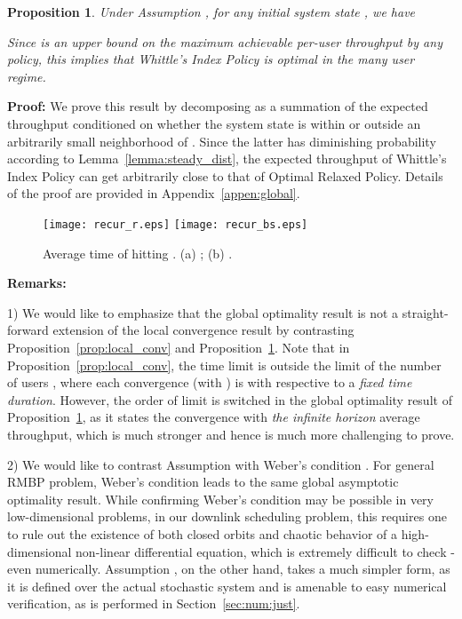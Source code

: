\documentclass[11pt,twocolumn]{IEEEtran}
\newtheorem{proposition}{Proposition}
\begin{document}
\begin{proposition}
\label{prop:asymp} Under Assumption , for any initial
system state , we have

\vspace{-12pt}
Since  is an upper bound on the maximum
achievable per-user throughput by any policy, this implies that
Whittle's Index Policy is optimal in the many user regime.
\end{proposition}

\noindent \textbf{Proof:} We prove this result by decomposing  as a summation of the expected throughput conditioned on whether the system state is within or outside an arbitrarily small  neighborhood of . Since the latter has diminishing probability according to Lemma~\ref{lemma:steady_dist}, the expected throughput of Whittle's Index Policy can get arbitrarily close to that of Optimal Relaxed Policy. Details of the proof are provided in Appendix~\ref{appen:global}. \vspace{3pt}

\begin{figure}
\centering
\texttt{[image: recur\_r.eps]}
\texttt{[image: recur\_bs.eps]}
\caption{Average time of hitting . (a) ; (b) . }
\vspace{-8pt}
\label{fig:recur_time}
\end{figure}

\noindent \textbf{Remarks: }



1) We would like to emphasize that the global optimality result is
not a straight-forward extension of the local convergence result by
contrasting Proposition~\ref{prop:local_conv} and
Proposition~\ref{prop:asymp}. Note that in
Proposition~\ref{prop:local_conv}, the time limit is outside the
limit of the number of users , where each convergence (with )
is with respective to a \emph{fixed time duration}. However, the
order of limit is switched in the global optimality result of
Proposition~\ref{prop:asymp}, as it states the convergence with 
\emph{the infinite horizon} average throughput, which is much
stronger and hence is much more challenging to prove.

2) We would like to contrast Assumption  with Weber's
condition \cite{Weber}. For general RMBP problem, Weber's condition
leads to the same global asymptotic optimality result. While
confirming Weber's condition may be possible in very low-dimensional
problems, in our downlink scheduling problem, this requires one to
rule out the existence of both closed orbits and chaotic behavior of
a high-dimensional non-linear differential equation, which is
extremely difficult to check - even numerically. Assumption ,
on the other hand, takes a much simpler form, as it is defined over
the actual stochastic system and is amenable to easy numerical
verification, as is performed in Section~\ref{sec:num:just}.
\end{document}
